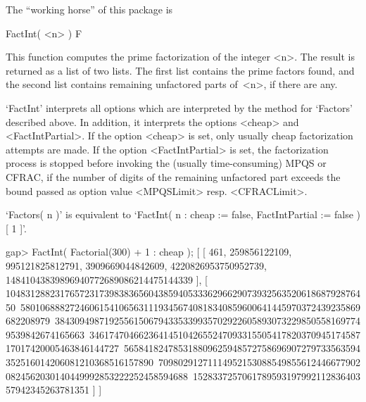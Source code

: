 The ``working horse'' of this package is


\>FactInt( <n> ) F

This function computes the prime factorization of the integer <n>.
The result is returned as a list of two lists. The first list
contains the prime factors found, and the second list contains remaining 
unfactored parts of~<n>, if there are any.

`FactInt' interprets all options which are interpreted by the method
for `Factors' described above. In addition, it interprets the options
<cheap> and <FactIntPartial>. If the option <cheap> is set, only usually
cheap factorization attempts are made. If the option <FactIntPartial>
is set, the factorization process is stopped before invoking the
(usually time-consuming) MPQS or CFRAC, if the number of digits of the
remaining unfactored part exceeds the bound passed as option value
<MPQSLimit> resp. <CFRACLimit>.

`Factors( n )' is equivalent to
`FactInt( n : cheap := false, FactIntPartial := false )[ 1 ]'.

\beginexample
gap> FactInt( Factorial(300) + 1 : cheap );
[ [ 461, 259856122109, 995121825812791, 3909669044842609, 4220826953750952739,
      14841043839896940772689086214475144339 ],
  [ 10483128823176572317398383656043859405333629662907393256352061868792876450\
580106888272460615410656311193456740818340859600641445970372439235869682208979\
384309498719255615067943353399357029226058930732298505581697749539842674165663\
346174704662364145104265524709331550541782037094517458717017420005463846144727\
565841824785318809625948572758696907279733563594352516014206081210368516157890\
709802912711149521530885498556124466779020824562030140449992853222252458594688\
152833725706178959319799211283640357942345263781351 ] ]
\endexample

